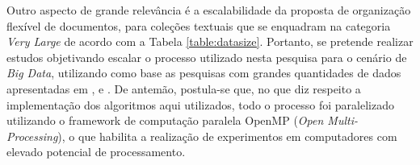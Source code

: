 Outro aspecto de grande relevância é a escalabilidade da proposta de organização flexível de
documentos, para coleções textuais que se enquadram na categoria {\it Very Large\/} de acordo com a
Tabela \ref{table:datasize}. Portanto, se pretende realizar estudos objetivando escalar o processo
utilizado nesta pesquisa para o cenário de {\it Big Data\/}, utilizando como base as pesquisas com
grandes quantidades de dados apresentadas em ,  e
. De antemão, postula-se que, no que diz respeito a implementação dos
algoritmos aqui utilizados, todo o processo foi paralelizado utilizando o framework de computação
paralela OpenMP ({\it Open Multi-Processing\/})\footnotemark, o que habilita a realização de
experimentos em computadores com elevado potencial de processamento.

